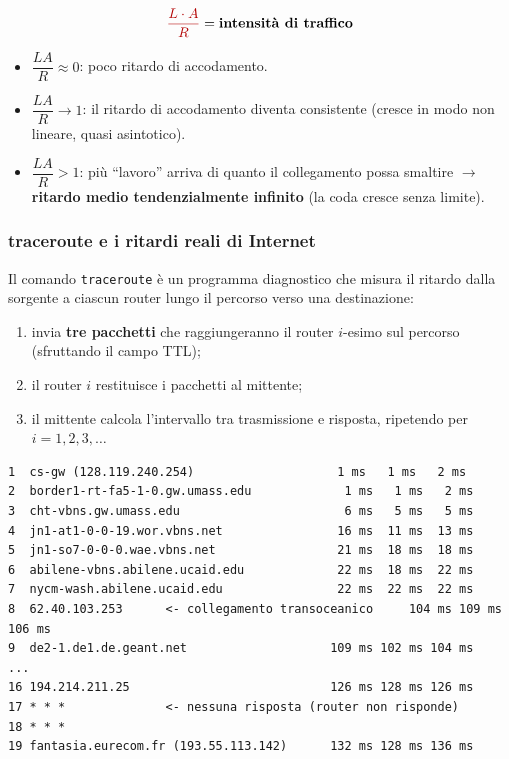 \documentclass[12pt, a4paper]{article}
\begin{document}
$$\textcolor{red!70!black}{\dfrac{L \cdot A}{R}} = \textbf{intensità di traffico}$$

\begin{itemize}
    \item $\dfrac{LA}{R} \approx 0$: poco ritardo di accodamento.
    \item $\dfrac{LA}{R} \to 1$: il ritardo di accodamento diventa consistente (cresce in modo non lineare, quasi asintotico).
    \item $\dfrac{LA}{R} > 1$: più ``lavoro'' arriva di quanto il collegamento possa smaltire $\rightarrow$ \textbf{ritardo medio tendenzialmente infinito} (la coda cresce senza limite).
\end{itemize}

\subsubsection{traceroute e i ritardi reali di Internet}

Il comando \texttt{traceroute} è un programma diagnostico che misura il ritardo dalla sorgente a ciascun router lungo il percorso verso una destinazione:
\begin{enumerate}
    \item invia \textbf{tre pacchetti} che raggiungeranno il router $i$-esimo sul percorso (sfruttando il campo TTL);
    \item il router $i$ restituisce i pacchetti al mittente;
    \item il mittente calcola l'intervallo tra trasmissione e risposta, ripetendo per $i=1,2,3,\dots$
\end{enumerate}

\begin{tcolorbox}[colback=lightergray!10, colframe=tocsec, title=\textbf{Esempio classico: traceroute da gaia.cs.umass.edu a www.eurecom.fr}]
\begin{footnotesize}
\begin{verbatim}
1  cs-gw (128.119.240.254)                    1 ms   1 ms   2 ms
2  border1-rt-fa5-1-0.gw.umass.edu             1 ms   1 ms   2 ms
3  cht-vbns.gw.umass.edu                       6 ms   5 ms   5 ms
4  jn1-at1-0-0-19.wor.vbns.net                16 ms  11 ms  13 ms
5  jn1-so7-0-0-0.wae.vbns.net                 21 ms  18 ms  18 ms
6  abilene-vbns.abilene.ucaid.edu             22 ms  18 ms  22 ms
7  nycm-wash.abilene.ucaid.edu                22 ms  22 ms  22 ms
8  62.40.103.253      <- collegamento transoceanico     104 ms 109 ms 106 ms
9  de2-1.de1.de.geant.net                    109 ms 102 ms 104 ms
...
16 194.214.211.25                            126 ms 128 ms 126 ms
17 * * *              <- nessuna risposta (router non risponde)
18 * * *
19 fantasia.eurecom.fr (193.55.113.142)      132 ms 128 ms 136 ms
\end{verbatim}
\end{footnotesize}
\end{tcolorbox}
\end{document}
